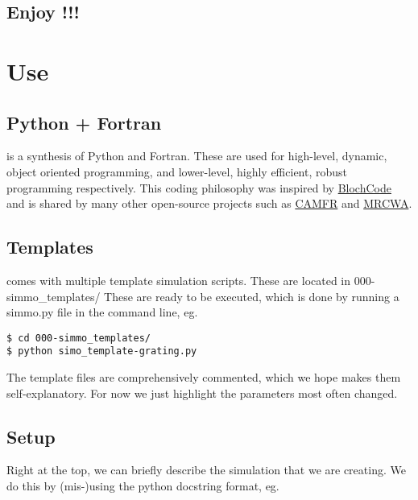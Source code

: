 \documentclass[11pt,a4paper,twoside]{report}
\begin{document}
\section*{Enjoy \CodeName!!!}









\chapter{Use}
\label{Use}


\section{Python + Fortran}

\CodeName is a synthesis of Python and Fortran. These are used for high-level, dynamic, object oriented programming, and lower-level, highly efficient, robust programming respectively. This coding philosophy was inspired by \href{https://launchpad.net/blochcode}{BlochCode} and is shared by many other open-source projects such as \href{http://camfr.sourceforge.net/index.html}{CAMFR} and \href{http://mrcwa.sourceforge.net/}{MRCWA}. 










\section{Templates}

\CodeName comes with multiple template simulation scripts. These are located in 000-simmo\_templates/
These are ready to be executed, which is done by running a simmo.py file in the command line, eg.

\begin{lstlisting}
$ cd 000-simmo_templates/
$ python simo_template-grating.py
\end{lstlisting}

The template files are comprehensively commented, which we hope makes them self-explanatory. For now we just highlight the parameters most often changed.






\section{Setup}
Right at the top, we can briefly describe the simulation that we are creating.
We do this by (mis-)using the python docstring format, eg.
\end{document}
